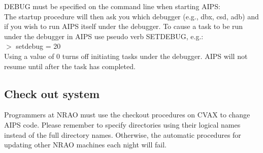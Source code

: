 DEBUG must be specified on the command line when starting AIPS:\\
The startup procedure will then ask you which debugger (e.g., dbx,
csd, adb) and if you wish to run AIPS itself under the debugger.
To cause a task to be run under the debugger in AIPS use pseudo verb
SETDEBUG, e.g.:\\
$>$ setdebug = 20\\
Using a value of 0 turns off initiating tasks under the debugger.
AIPS will not resume until after the task has completed.

\subsection{Check out system }

Programmers at NRAO must use the checkout procedures on CVAX to change
AIPS code.  Please remember to specify directories using their logical
names instead of the full directory names.  Otherwise, the automatic
procedures for updating other NRAO machines each night will fail.

